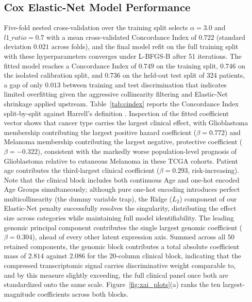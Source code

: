\documentclass[sigconf, review=true]{acmart}
\begin{document}
\subsection{Cox Elastic-Net Model Performance}
Five-fold nested cross-validation over the training split selects $\alpha = 3.0$ and $l1\_ratio = 0.7$ with a mean cross-validated Concordance Index of $0.722$ (standard deviation $0.021$ across folds), and the final model refit on the full training split with these hyperparameters converges under L-BFGS-B after 51 iterations. The fitted model reaches a Concordance Index of $0.749$ on the training split, $0.746$ on the isolated calibration split, and $0.736$ on the held-out test split of 324 patients, a gap of only $0.013$ between training and test discrimination that indicates limited overfitting given the aggressive collinearity filtering and Elastic-Net shrinkage applied upstream. Table~\ref{tab:cindex} reports the Concordance Index split-by-split against Harrell's definition \cite{harrell1982evaluating}. Inspection of the fitted coefficient vector shows that cancer type carries the largest clinical effect, with Glioblastoma membership contributing the largest positive hazard coefficient ($\beta = 0.772$) and Melanoma membership contributing the largest negative, protective coefficient ($\beta = -0.322$), consistent with the markedly worse population-level prognosis of Glioblastoma relative to cutaneous Melanoma in these TCGA cohorts. Patient age contributes the third-largest clinical coefficient ($\beta = 0.293$, risk-increasing). Note that the clinical block includes both continuous Age and one-hot encoded Age Groups simultaneously; although pure one-hot encoding introduces perfect multicollinearity (the dummy variable trap), the Ridge ($L_2$) component of our Elastic-Net penalty successfully resolves the singularity, distributing the effect size across categories while maintaining full model identifiability. The leading genomic principal component contributes the single largest genomic coefficient ($\beta = 0.304$), ahead of every other latent expression axis. Summed across all 50 retained components, the genomic block contributes a total absolute coefficient mass of $2.814$ against $2.086$ for the 20-column clinical block, indicating that the compressed transcriptomic signal carries discriminative weight comparable to, and by this measure slightly exceeding, the full clinical panel once both are standardized onto the same scale. Figure~\ref{fig:xai_plots}(a) ranks the ten largest-magnitude coefficients across both blocks.
\end{document}
